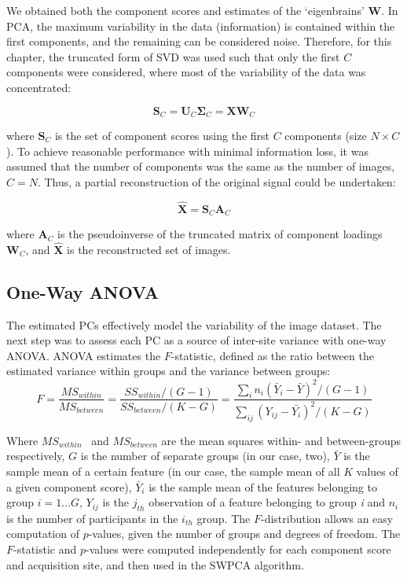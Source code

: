 We obtained both the component scores and estimates of the `eigenbrains' $\mathbf{W}$. In \ac{PCA}, the maximum variability in the data (information) is contained within the first components, and the remaining can be considered noise. Therefore, for this chapter, the truncated form of \ac{SVD} was used such that only the first $C$ components were considered, where most of the variability of the data was concentrated:

\begin{equation}
	\mathbf{S}_C = \mathbf{U}_C \boldsymbol{\Sigma}_C = \mathbf{X}\mathbf{W}_C
\end{equation}

where  $\mathbf{S}_C$ is the set of component scores using the first $C$ components (size $N\times C$). To achieve reasonable performance with minimal information loss, it was assumed that the number of components was the same as the number of images, $C=N$. Thus, a partial reconstruction of the original signal could be undertaken:

\begin{equation}\label{eq:swpcareconst}
	\hat{\mathbf{X}}=\mathbf{S}_C \mathbf{A}_C
\end{equation}

where  $\mathbf{A}_C$ is the pseudoinverse of the truncated matrix of component loadings  $\mathbf{W}_C$, and  $\hat{\mathbf{X}}$ is the reconstructed set of images.


\subsection{One-Way \acf{ANOVA}}
The estimated PCs effectively model the variability of the image dataset. The next step was to assess each PC as a source of inter-site variance with one-way \acf{ANOVA}. \ac{ANOVA} estimates the $F$-statistic, defined as the ratio between the estimated variance within groups and the variance between groups:
\begin{equation}
F=\frac{M{S}_{\mathit{within}}}{M{S}_{\mathit{between}}}=\frac{S{S}_{\mathit{within}}/(G-1)}{S{S}_{\mathit{between}}/(K-G)}=\frac{\sum
	_{i}{{n}_{i}{\left({\bar{{Y}}}_{i}-\bar{{Y}}\right)}^{2}/{\left(G-1\right)}}}{\sum
	_{\mathit{ij}}{{\left({Y}_{\mathit{ij}}-\bar{{{Y}_{i}}}\right)}^{2}/{\left(K-G\right)}}}
\end{equation}

Where  $M{S}_{\mathit{within}}$ \ and  $M{S}_{\mathit{between}}$ are the mean squares within- and between-groups respectively, $G$ is the number of separate groups (in our case, two),  $\bar{Y}$ is the sample mean of a certain feature (in our case, the sample mean of all $K$ values of a given component score),  ${\bar{Y}}_{i}$ is the sample mean of the features belonging to group $i=1\dots G$, ${Y}_{\mathit{ij}}$ is the $j_{th}$ observation of a feature belonging to group \textit{i} and  ${n}_{i}$ is the number of participants in the  $i_{th}$ group. The $F$-distribution allows an easy computation of $p$-values, given the number of groups and degrees of freedom. The $F$-statistic and $p$-values were computed independently for each component score and acquisition site, and then used in the \ac{SWPCA} algorithm.

